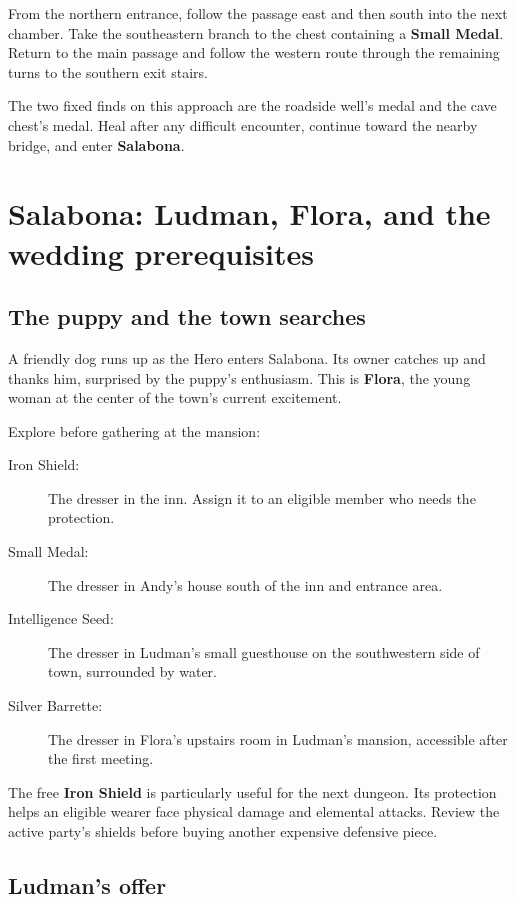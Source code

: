 From the northern entrance, follow the passage east and then south
into the next chamber. Take the southeastern branch to the chest
containing a \textbf{Small Medal}. Return to the main passage and
follow the western route through the remaining turns to the southern
exit stairs.

The two fixed finds on this approach are the roadside well's medal
and the cave chest's medal. Heal after any difficult encounter,
continue toward the nearby bridge, and enter \textbf{Salabona}.

\section{Salabona: Ludman, Flora, and the wedding prerequisites}

\subsection*{The puppy and the town searches}

A friendly dog runs up as the Hero enters Salabona. Its owner catches
up and thanks him, surprised by the puppy's enthusiasm. This is
\textbf{Flora}, the young woman at the center of the town's current
excitement.

Explore before gathering at the mansion:
\begin{description}
  \item[Iron Shield:] The dresser in the inn. Assign it to an eligible
    member who needs the protection.
  \item[Small Medal:] The dresser in Andy's house south of the inn
    and entrance area.
  \item[Intelligence Seed:] The dresser in Ludman's small guesthouse
    on the southwestern side of town, surrounded by water.
  \item[Silver Barrette:] The dresser in Flora's upstairs room in
    Ludman's mansion, accessible after the first meeting.
\end{description}

The free \textbf{Iron Shield} is particularly useful for the next
dungeon. Its protection helps an eligible wearer face physical damage
and elemental attacks. Review the active party's shields before buying
another expensive defensive piece.

\subsection*{Ludman's offer}

